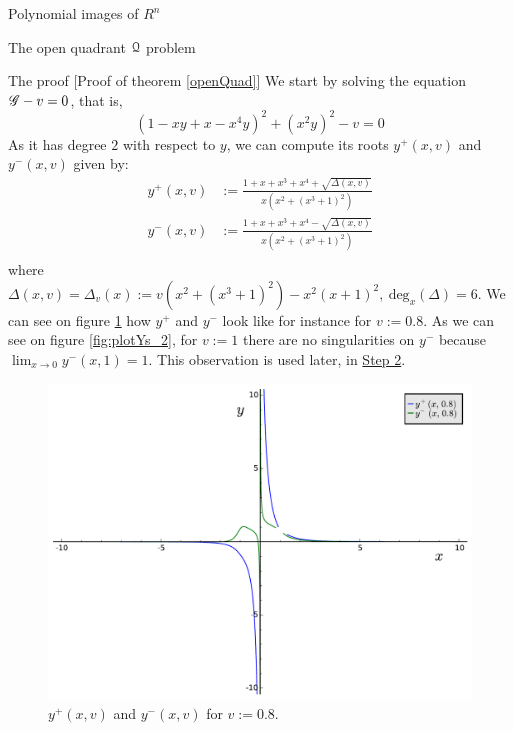 \documentclass[11pt, a4paper, english, twoside, notitlepage, openright]{report}
\begin{document}
\begin{chapter}{Polynomial images of $R^n$}
\begin{section}{The open quadrant $\mathcal{Q}$ problem}
\begin{subsection}{The proof} [Proof of theorem \ref{openQuad}]
We start by solving the equation $\mathscr{G}-v=0$, that is, 
$$
(1-xy+x-x^4y)^2+(x^2y)^2-v=0
$$ 
As it has degree $2$ with respect to $y$, we can compute its roots $y^+(x,v)$ and $y^-(x,v)$ given by:
\begin{equation*}
\begin{aligned}
y^+(x,v)&:=\frac{1+x+x^3+x^4+\sqrt{\Delta(x,v)}}{x(x^2+(x^3+1)^2)}\\
y^-(x,v)&:=\frac{1+x+x^3+x^4-\sqrt{\Delta(x,v)}}{x(x^2+(x^3+1)^2)}\\
\end{aligned}
\end{equation*}
where $\Delta(x,v)=\Delta_v(x):=v(x^2+(x^3+1)^2)-x^2(x+1)^2,\ \text{deg}_x(\Delta)=6$. We can see on figure \ref{fig:plotYs_1} how $y^+$ and $y^-$ look like for instance for $v:=0.8$. As we can see on figure \ref{fig:plotYs_2}, for $v:=1$ there are no singularities on $y^-$ because $\lim_{x\rightarrow0}y^-(x,1)=1$. This observation is used later, in \hyperref[step2]{Step 2}.
\begin{figure}[h]
\centering
\includegraphics[width=1\textwidth]{plots/ch1_06_sols.pdf}
\caption{$y^+(x,v)$ and $y^-(x,v)$ for $v:= 0.8$.\label{fig:plotYs_1}}
\end{figure}
\begin{figure}[h]
\centering

\end{figure}
\end{subsection}
\end{section}
\end{chapter}
\end{document}

